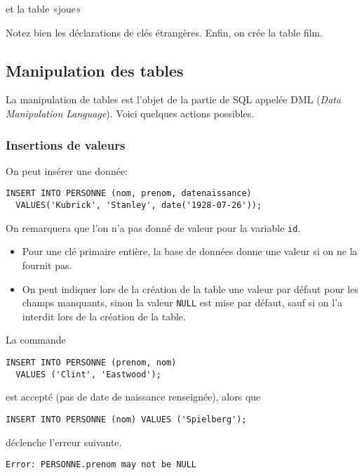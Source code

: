 et la table «joue»


Notez bien les déclarations de clés étrangères.
Enfin, on crée la table \og film\fg .

\subsection{Manipulation des tables }

La manipulation de tables est l'objet de la partie de SQL appelée DML (\emph{Data Manipulation
Language}). Voici quelques actions possibles.
\subsubsection{Insertions de valeurs}

On peut insérer une donnée:
\begin{lstlisting}
INSERT INTO PERSONNE (nom, prenom, datenaissance)
  VALUES('Kubrick', 'Stanley', date('1928-07-26'));
\end{lstlisting}

On remarquera que l'on n'a pas donné de valeur pour la variable \texttt{id}.

\begin{itemize}
\item Pour une clé primaire entière, la base de données donne une
  valeur si on ne la fournit pas.
\item On peut indiquer lors de la création de
  la table une valeur par défaut pour les champs manquants, sinon la
  valeur \texttt{NULL} est mise par défaut, sauf si on l'a interdit
  lors de la création de la table.
\end{itemize}

\begin{exemple}
La commande
\begin{lstlisting}
INSERT INTO PERSONNE (prenom, nom)
  VALUES ('Clint', 'Eastwood');
\end{lstlisting}
est accepté (pas de date de naissance renseignée), alors que 
\begin{lstlisting}
INSERT INTO PERSONNE (nom) VALUES ('Spielberg');
\end{lstlisting}
déclenche l'erreur suivante. 
\begin{Verbatim}
Error: PERSONNE.prenom may not be NULL
\end{Verbatim}
\end{exemple}



